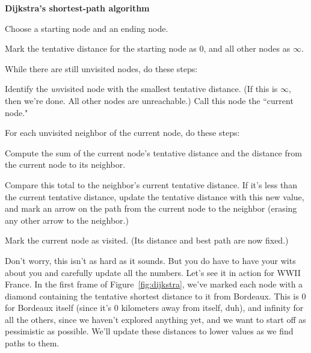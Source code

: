 \vspace{.1in}
\begin{samepage}
\begin{framed}
\textbf{Dijkstra's shortest-path algorithm}
\begin{compactenum}
\item Choose a starting node and an ending node.
\item Mark the tentative distance for the starting node as 0, and all
other nodes as $\infty$.
\item While there are still unvisited nodes, do these steps:
    \begin{compactenum}
    \item \label{choose} Identify the \textit{un}visited node with the smallest tentative
distance. (If this is $\infty$, then we're done. All other nodes are
unreachable.) Call this node the ``current node."
    \item For each unvisited neighbor of the current node, do these steps:
        \begin{compactenum}
        \item Compute the sum of the current node's tentative distance and
the distance from the current node to its neighbor.
        \item Compare this total to the neighbor's current tentative
distance. If it's less than the current tentative distance, update the
tentative distance with this new value, and mark an arrow on the path from
the current node to the neighbor (erasing any other arrow to the neighbor.)
        \item Mark the current node as visited. (Its distance and best path
are now fixed.)
        \end{compactenum}
    \end{compactenum}
\end{compactenum}
\end{framed}
\end{samepage}
\vspace{.2in}

Don't worry, this isn't as hard as it sounds. But you do have to have your
wits about you and carefully update all the numbers. Let's see it in action
for WWII France. In the first frame of Figure~\ref{fig:dijkstra}, we've marked
each node with a diamond containing the tentative shortest distance to it
from Bordeaux. This is 0 for Bordeaux itself (since it's 0 kilometers away
from itself, duh), and infinity for all the others, since we haven't
explored anything yet, and we want to start off as pessimistic as possible.
We'll update these distances to lower values as we find paths to them.


